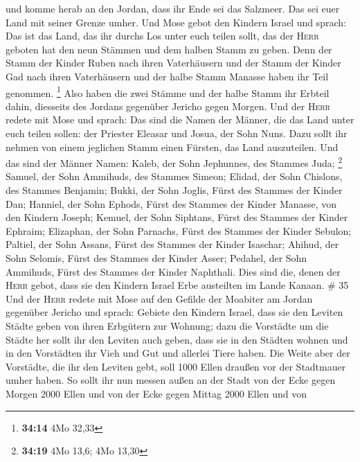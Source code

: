  und komme herab an den Jordan, dass ihr Ende sei das
Salzmeer. Das sei euer Land mit seiner Grenze umher.  Und
Mose gebot den Kindern Israel und sprach: Das ist das Land, das ihr
durchs Los unter euch teilen sollt, das der \textsc{Herr} geboten hat
den neun Stämmen und dem halben Stamm zu geben.  Denn der
Stamm der Kinder Ruben nach ihren Vaterhäusern und der Stamm der Kinder
Gad nach ihren Vaterhäusern und der halbe Stamm Manasse haben ihr Teil
genommen. \footnote{\textbf{34:14} 4Mo 32,33}  Also haben
die zwei Stämme und der halbe Stamm ihr Erbteil dahin, diesseits des
Jordans gegenüber Jericho gegen Morgen.  Und der
\textsc{Herr} redete mit Mose und sprach:  Das sind die
Namen der Männer, die das Land unter euch teilen sollen: der Priester
Eleasar und Josua, der Sohn Nuns.  Dazu sollt ihr nehmen
von einem jeglichen Stamm einen Fürsten, das Land auszuteilen.
 Und das sind der Männer Namen: Kaleb, der Sohn
Jephunnes, des Stammes Juda; \footnote{\textbf{34:19} 4Mo 13,6; 4Mo
  13,30}  Samuel, der Sohn Ammihuds, des Stammes Simeon;
 Elidad, der Sohn Chislons, des Stammes Benjamin;
 Bukki, der Sohn Joglis, Fürst des Stammes der Kinder
Dan;  Hanniel, der Sohn Ephods, Fürst des Stammes der
Kinder Manasse, von den Kindern Joseph;  Kemuel, der Sohn
Siphtans, Fürst des Stammes der Kinder Ephraim; 
Elizaphan, der Sohn Parnachs, Fürst des Stammes der Kinder Sebulon;
 Paltiel, der Sohn Assans, Fürst des Stammes der Kinder
Isaschar;  Ahihud, der Sohn Selomis, Fürst des Stammes
der Kinder Asser;  Pedahel, der Sohn Ammihuds, Fürst des
Stammes der Kinder Naphthali.  Dies sind die, denen der
\textsc{Herr} gebot, dass sie den Kindern Israel Erbe austeilten im
Lande Kanaan. \# 35  Und der \textsc{Herr} redete mit Mose
auf den Gefilde der Moabiter am Jordan gegenüber Jericho und sprach:
 Gebiete den Kindern Israel, dass sie den Leviten Städte
geben von ihren Erbgütern zur Wohnung;  dazu die Vorstädte
um die Städte her sollt ihr den Leviten auch geben, dass sie in den
Städten wohnen und in den Vorstädten ihr Vieh und Gut und allerlei Tiere
haben.  Die Weite aber der Vorstädte, die ihr den Leviten
gebt, soll 1000 Ellen draußen vor der Stadtmauer umher haben.
 So sollt ihr nun messen außen an der Stadt von der Ecke
gegen Morgen 2000 Ellen und von der Ecke gegen Mittag 2000 Ellen und von
